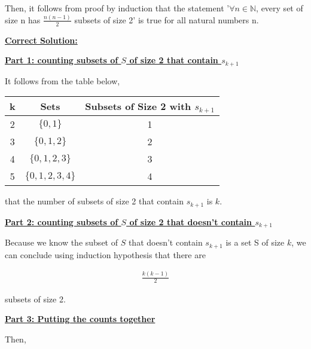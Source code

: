 \documentclass[12pt]{article}
\begin{document}
\begin{enumerate}[a.]
    \bigskip

    Then, it follows from proof by induction that the statement '$\forall n \in \mathbb{N}$,
    every set of size n has $\frac{n(n-1)}{2}$ subsets of size 2' is true for all
    natural numbers n.


    \begin{mdframed}
        \underline{\textbf{Correct Solution:}}

        \underline{\textbf{Part 1: counting subsets of $S$ of size 2 that contain $s_{k+1}$}}

        \bigskip

        It follows from the table below,

        \color{red}
        \begin{tabular}{|c|c|c|}
            \hline
            k & Sets & Subsets of Size 2 with $s_{k+1}$\\
            \hline
            2 & $\{0,1\}$ & 1\\
            \hline
            3 & $\{0,1,2\}$ & 2\\
            \hline
            4 & $\{0,1,2,3\}$ & 3\\
            \hline
            5 & $\{0,1,2,3,4\}$ & 4\\
            \hline
        \end{tabular}
        \color{black}

        that the number of subsets of size 2 that contain $s_{k+1}$ is \color{red}\textbf{$k$}\color{black}.

        \bigskip

        \underline{\textbf{Part 2: counting subsets of $S$ of size 2 that doesn't contain $s_{k+1}$}}

        \bigskip

        Because we know the subset of $S$ that doesn't contain $s_{k+1}$ is a set S
        of size $k$, we can conclude using induction hypothesis that there are

        \color{red}
        \begin{align}
            \frac{k(k-1)}{2}
        \end{align}
        \color{black}

        subsets of size 2.

        \bigskip

        \underline{\textbf{Part 3: Putting the counts together}}

        \bigskip

        Then,


\end{mdframed}
\end{enumerate}
\end{document}
